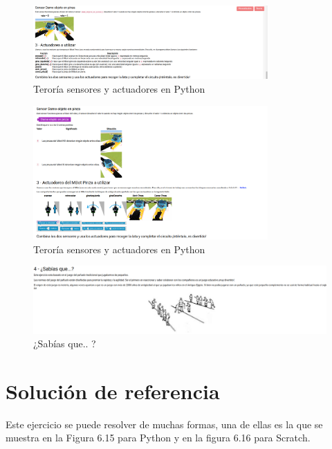 \begin{figure}[H]
    \centering
    \includegraphics[width=0.8\textwidth, height=0.4\textwidth]{chapters/images/teoriag4python.png}
    \caption{Teroría sensores y actuadores en Python}
    \label{fig:my_label}
\end{figure}
\begin{figure}[H]
    \centering
    \includegraphics[width=0.8\textwidth, height=0.4\textwidth]{chapters/images/teoriag4scratch.png}
    \caption{Teroría sensores y actuadores en Python}
    \label{fig:my_label}
\end{figure}
\begin{figure}[H]
    \centering
    \includegraphics[width=1 \textwidth, height=0.3\textwidth]{chapters/images/teoriag5.png}
    \caption{¿Sabías que.. ?}
    \label{fig:my_label}
\end{figure}

\section{Solución de referencia}
Este ejercicio se puede resolver de muchas formas, una de ellas es la que se muestra en la Figura 6.15 para Python y  en la figura 6.16 para Scratch. 

